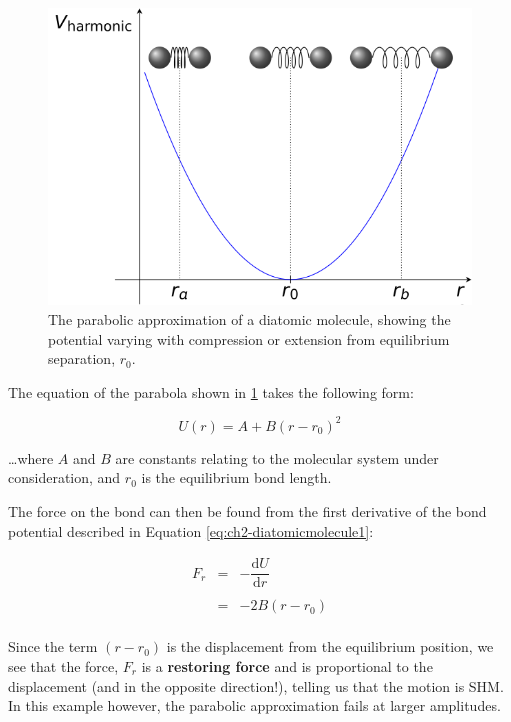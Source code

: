 \documentclass[
]{book}
\begin{document}
\begin{figure}

{\centering \includegraphics[width=0.7\linewidth]{visualisations//latex/ch2-diatomicmolecule2} 

}

\caption{The parabolic approximation of a diatomic molecule, showing the potential varying with compression or extension from equilibrium separation, $r_0$. }\label{fig:ch2-diatomicmolecule2}
\end{figure}

The equation of the parabola shown in \ref{fig:ch2-diatomicmolecule2} takes the following form:

\begin{equation}
U(r) = A + B(r - r_0)^2
\label{eq:ch2-diatomicmolecule1}
\end{equation}

\ldots where \(A\) and \(B\) are constants relating to the molecular system under consideration, and \(r_0\) is the equilibrium bond length.

The force on the bond can then be found from the first derivative of the bond potential described in Equation \eqref{eq:ch2-diatomicmolecule1}:

\begin{equation}
\begin{array}{rcl}
F_r &=& - \dfrac{\mathrm{d}U}{\mathrm{d}r} \\
\\
&=& -2B(r-r_0)\\
\end{array}
\label{eq:ch2-diatomicmolecule2}
\end{equation}

Since the term \((r-r_0)\) is the displacement from the equilibrium position, we see that the force, \(F_r\) is a \textbf{restoring force} and is proportional to the displacement (and in the opposite direction!), telling us that the motion is SHM. In this example however, the parabolic approximation fails at larger amplitudes.
\end{document}
